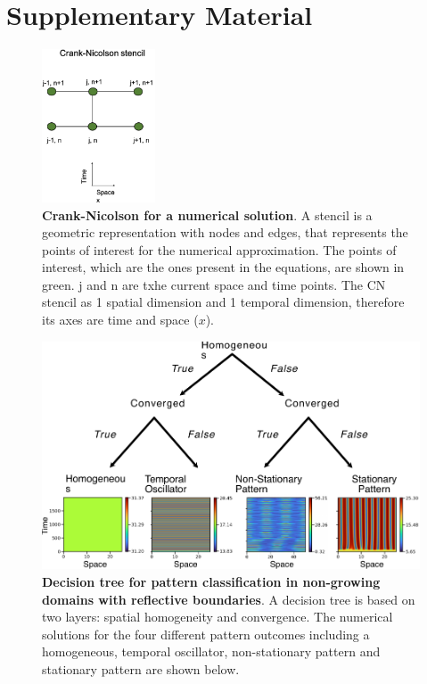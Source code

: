 \section{Supplementary Material}
\newcommand{\beginsupplement}{%
    \setcounter{table}{0}
    \renewcommand{\thetable}{S\arabic{table}}%
    \setcounter{figure}{0}
    \renewcommand{\thefigure}{S\arabic{figure}}%
}
\beginsupplement

\begin{figure}[!ht]
    \center
    \includegraphics[width=0.3\textwidth]{figures/stencils}

    \caption{\textbf{Crank-Nicolson for a numerical solution}. A stencil is a geometric representation with nodes and edges, that represents the points of interest for the numerical approximation. The points of interest, which are the ones present in the equations, are shown in green. j and n are txhe current space and time points. The CN stencil as 1 spatial dimension and 1 temporal dimension, therefore its axes are time and space ($x$). }   \label{sup_fig1}
\end{figure}


\begin{figure}[!h]
    \includegraphics[width=1\textwidth]{figures/no_growth_classification}

    \caption{\textbf{Decision tree for pattern classification in non-growing domains with reflective boundaries}. A decision tree is based on two layers: spatial homogeneity and convergence. The numerical solutions for the four different pattern outcomes including a homogeneous, temporal oscillator, non-stationary pattern and stationary pattern are shown below.}
    \label{sup_fig2}
\end{figure}


